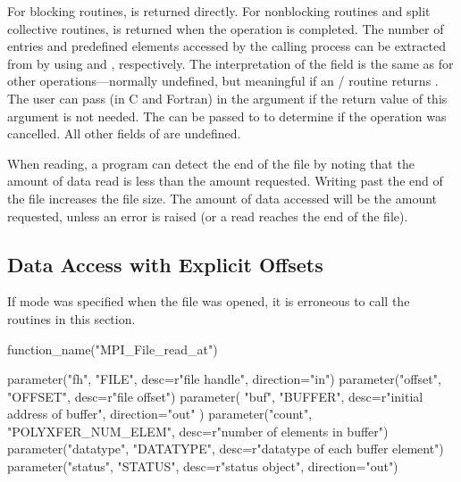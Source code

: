 For blocking routines,  is returned directly.
For nonblocking routines and split collective routines,
 is returned when the operation is completed.
The number of  entries and predefined elements accessed
by the calling process
can be extracted from  by using
 and
, respectively.
The interpretation of the  field is the same as for other
operations---normally undefined, but meaningful if an \MPI/ routine returns 
.
The user can pass (in C and
Fortran)
in the  argument
if the return value of this argument is not needed.
The  can be passed to 
to determine if the operation was cancelled.
All other fields of  are undefined.

When reading, a program can detect the end of the file
by noting that the amount of data read is less than the amount requested.
Writing past the end of the file increases the file size.
The amount of data accessed will be the amount requested,
unless an error is raised (or a read reaches the end of the file).

\subsection{Data Access with Explicit Offsets}
\label{sec:io-explicit}

If  mode was specified when the file was opened,
it is erroneous to call the routines in this section.

%
%
%
\begin{mpi-binding}
    function_name("MPI_File_read_at")
    
    parameter("fh", "FILE", desc=r"file handle", direction="in")
    parameter("offset", "OFFSET", desc=r"file offset")
    parameter(
        "buf", "BUFFER", desc=r"initial address of buffer", direction="out"
    )
    parameter("count", "POLYXFER_NUM_ELEM", desc=r"number of elements in buffer")
    parameter("datatype", "DATATYPE", desc=r"datatype of each buffer element")
    parameter("status", "STATUS", desc=r"status object", direction="out")
\end{mpi-binding}

